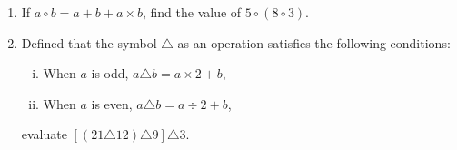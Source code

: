 \documentclass[11pt]{scrartcl}
\begin{document}
\begin{enumerate}
    \vspace{10cm} \item If $a \circ b = a + b + a \times b$, find the value of $5 \circ (8 \circ 3)$.
    
    \vspace{10cm} \item Defined that the symbol $\triangle$ as an operation satisfies the following conditions:
    \begin{enumerate}[(i)]
        \vspace{10cm} \item When $a$ is odd, $a \triangle b = a \times 2 + b$,
        \vspace{10cm} \item When $a$ is even, $a \triangle b = a \div 2 + b$,
    \end{enumerate}
    evaluate $[(21 \triangle 12) \triangle 9] \triangle 3$.


    \vspace{10cm} 

\end{enumerate}
\end{document}
